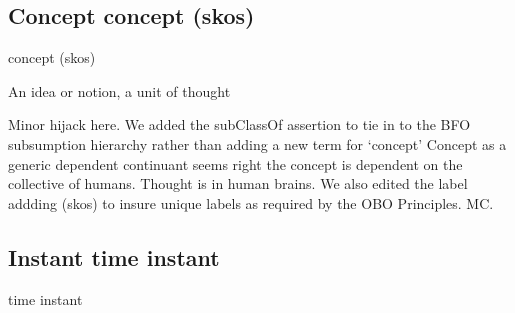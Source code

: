 \documentclass[letterpaper,10pt,english]{sphinxmanual}
\begin{document}
\subsection{Concept \sphinxhyphen{} concept (skos)}
\label{\detokenize{doc-Concept:concept-concept-skos}}\label{\detokenize{doc-Concept:index-0}}\label{\detokenize{doc-Concept::doc}}
\begin{sphinxShadowBox}

\sphinxAtStartPar
concept (skos)
\end{sphinxShadowBox}

\begin{sphinxShadowBox}

\sphinxAtStartPar
{\hyperref[\detokenize{doc-BFO_0000031::doc}]{}}
\end{sphinxShadowBox}

\begin{sphinxShadowBox}

\sphinxAtStartPar
An idea or notion, a unit of thought
\end{sphinxShadowBox}

\begin{sphinxShadowBox}

\sphinxAtStartPar
Minor hijack here.  We added the subClassOf assertion to tie in to the BFO subsumption hierarchy rather than adding a new term for ‘concept’
Concept as a generic dependent continuant seems right \textendash{} the concept is dependent on the collective of humans.  Thought is in human brains.
We also edited the label addding (skos) to insure unique labels as required by the OBO Principles. MC.
\end{sphinxShadowBox}
\begin{quote}

\ignorespaces \end{quote}


\subsection{Instant \sphinxhyphen{} time instant}
\label{\detokenize{doc-Instant:instant-time-instant}}\label{\detokenize{doc-Instant:index-0}}\label{\detokenize{doc-Instant::doc}}
\begin{sphinxShadowBox}

\sphinxAtStartPar
time instant
\end{sphinxShadowBox}
\end{document}

